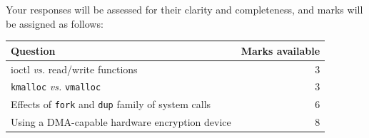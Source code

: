 \documentclass[12pt,a4paper]{article}
\begin{document}
Your responses will be assessed for their clarity and completeness, and marks
will be assigned as follows:

\begin{longtable}{p{13cm} r}
    \toprule
    \textbf{Question} & \textbf{Marks available} \\
    \midrule

    ioctl \textit{vs.} read\slash write functions & 3 \\
    \texttt{kmalloc} \textit{vs.} \texttt{vmalloc} & 3 \\
    Effects of \texttt{fork} and \texttt{dup} family of system calls & 6 \\
    Using a DMA-capable hardware encryption device & 8 \\

    \bottomrule
\end{longtable}
\end{document}
